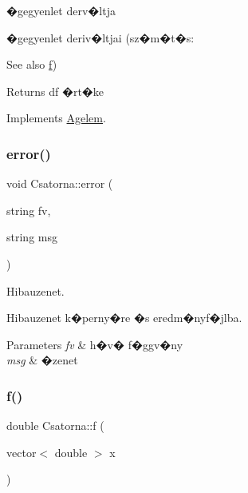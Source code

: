 �gegyenlet derv�ltja 

�gegyenlet deriv�ltjai (sz�m�t�s\+:

\begin{DoxySeeAlso}{See also}
\hyperlink{class_csatorna_a5cd4e0975717ce0baab89f57a566782a}{f}) 
\end{DoxySeeAlso}
\begin{DoxyReturn}{Returns}
df �rt�ke 
\end{DoxyReturn}


Implements \hyperlink{class_agelem_a7934ea6320bdc37526ed3daa108ce1ed}{Agelem}.

\hypertarget{class_csatorna_a765dd9b66d2a18b567a6045d17266a10}{}\label{class_csatorna_a765dd9b66d2a18b567a6045d17266a10} 
\subsubsection{\texorpdfstring{error()}{error()}}
{\footnotesize\ttfamily void Csatorna\+::error (\begin{DoxyParamCaption}\item[{string}]{fv,  }\item[{string}]{msg }\end{DoxyParamCaption})}



Hibauzenet. 

Hibauzenet k�perny�re �s eredm�nyf�jlba.


\begin{DoxyParams}{Parameters}
{\em fv} & h�v� f�ggv�ny \\
\hline
{\em msg} & �zenet \\
\hline
\end{DoxyParams}
\hypertarget{class_csatorna_a5cd4e0975717ce0baab89f57a566782a}{}\label{class_csatorna_a5cd4e0975717ce0baab89f57a566782a} 
\subsubsection{\texorpdfstring{f()}{f()}}
{\footnotesize\ttfamily double Csatorna\+::f (\begin{DoxyParamCaption}\item[{vector$<$ double $>$}]{x }\end{DoxyParamCaption})\hspace{0.3cm}{\ttfamily [virtual]}}



